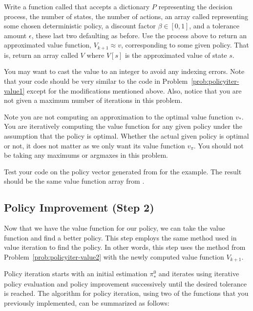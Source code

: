 \begin{problem}
\label{prob:policyiter-value3}
Write a function called  that accepts a dictionary $P$ representing the decision process, the number of states, the number of actions, an array called  representing some chosen deterministic policy, a discount factor $\beta \in [0,1]$, and a tolerance amount $\epsilon$, these last two defaulting as before.
Use the process above to return an approximated value function, $V_{k+1}\approx v$, corresponding to some given policy.
That is, return an array called $V$ where $V[s]$ is the approximated value of state $s$.

You may want to cast the value  to an integer to avoid any indexing errors.
Note that your code should be very similar to the code in Problem\ \ref{prob:policyiter-value1} except for the modifications mentioned above.
Also, notice that you are not given a maximum number of iterations in this problem.

Note you are not computing an approximation to the optimal value function $v_*$.
You are iteratively computing the value function for any given policy under the assumption that the policy is optimal.
Whether the actual given policy is optimal or not, it does not matter as we only want its value function $v_{\pi}$.
You should not be taking any maximums or argmaxes in this problem.

Test your code on the policy vector generated from  for the example.
The result should be the same value function array from .
\end{problem}

\subsection*{Policy Improvement (Step 2)}
Now that we have the value function for our policy, we can take the value function and find a better policy.
This step employs the same method used in value iteration to find the policy.
In other words, this step uses the  method from Problem\ \ref{prob:policyiter-value2} with the newly computed value function $V_{k+1}$.

Policy iteration starts with an initial estimation $\pi_*^{0}$ and iterates using iterative policy evaluation and policy improvement successively until the desired tolerance is reached.
The algorithm for policy iteration, using two of the functions that you previously implemented, can be summarized as follows:

